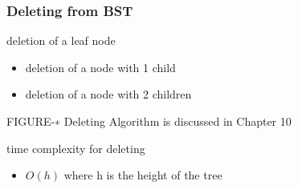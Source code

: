 \documentclass[newPxFont,sthlmFooter,nooffset]{beamer}
\begin{document}
\begin{frame}[t]
  \frametitle{Deleting from  BST}
deletion of a leaf node
\begin{itemize}
\item deletion of a node with 1 child
\item deletion of a node with 2
  children
\end{itemize}

FIGURE-∗ Deleting Algorithm is discussed in Chapter 10

time complexity for deleting
\begin{itemize}
\item $O(h)$ where h is the height of the tree
\end{itemize}

\end{frame}
\end{document}
